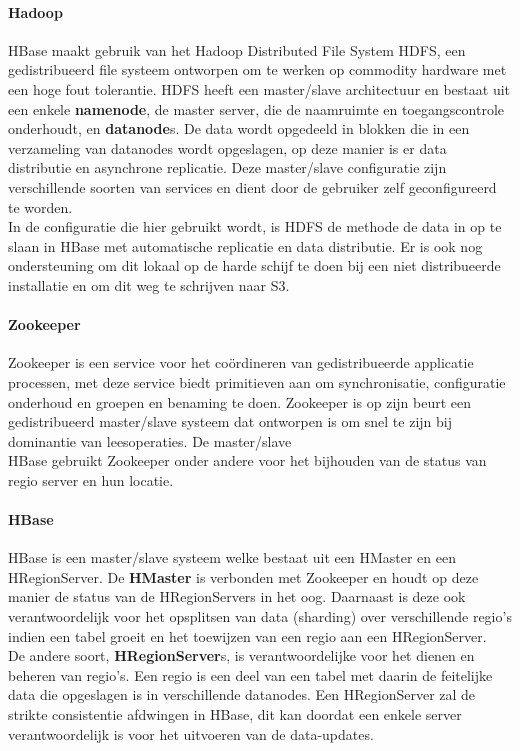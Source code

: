 \paragraph{Hadoop\cite{borthakur2007hadoop}} HBase maakt gebruik van het Hadoop Distributed File System HDFS, een gedistribueerd file systeem ontworpen om te werken op commodity hardware met een hoge fout tolerantie. HDFS heeft een master/slave architectuur en bestaat uit een enkele \textbf{namenode}, de master server, die de naamruimte en toegangscontrole onderhoudt, en \textbf{datanode}s. De data wordt opgedeeld in blokken die in een verzameling van datanodes wordt opgeslagen, op deze manier is er data distributie en asynchrone replicatie. Deze master/slave configuratie zijn verschillende soorten van services en dient door de gebruiker zelf geconfigureerd te worden. \\
In de configuratie die hier gebruikt wordt, is HDFS de methode de data in op te slaan in HBase met automatische replicatie en data distributie. Er is ook nog ondersteuning om dit lokaal op de harde schijf te doen bij een niet distribueerde installatie en om dit weg te schrijven naar S3.\cite{george2011hbase}

\paragraph{Zookeeper\cite{hunt2010zookeeper}} Zookeeper is een service voor het coördineren van gedistribueerde applicatie processen, met deze service biedt primitieven aan om synchronisatie, configuratie onderhoud en groepen en benaming te doen. Zookeeper is op zijn beurt een gedistribueerd master/slave systeem dat ontworpen is om snel te zijn bij dominantie van leesoperaties. De master/slave \\
HBase gebruikt Zookeeper onder andere voor het bijhouden van de status van regio server en hun locatie. \cite{george2011hbase}

\paragraph{HBase\cite{george2011hbase}} HBase is een master/slave systeem welke bestaat uit een HMaster en een HRegionServer. De \textbf{HMaster} is verbonden met Zookeeper en houdt op deze manier de status van de HRegionServers in het oog. Daarnaast is deze ook verantwoordelijk voor het opsplitsen van data (sharding) over verschillende regio's indien een tabel groeit en het toewijzen van een regio aan een HRegionServer.\\
De andere soort, \textbf{HRegionServer}s, is verantwoordelijke voor het dienen en beheren van regio's. Een regio is een deel van een tabel met daarin de feitelijke data die opgeslagen is in verschillende datanodes. Een HRegionServer zal de strikte consistentie afdwingen in HBase, dit kan doordat een enkele server verantwoordelijk is voor het uitvoeren van de data-updates. 

